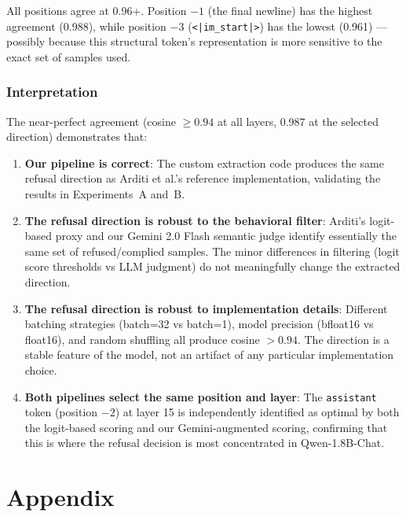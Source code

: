 \documentclass[11pt,a4paper]{article}
\begin{document}
All positions agree at 0.96+. Position $-1$ (the final newline) has the highest agreement (0.988), while position $-3$ (\texttt{<|im\_start|>}) has the lowest (0.961) --- possibly because this structural token's representation is more sensitive to the exact set of samples used.

\section{Interpretation}

The near-perfect agreement (cosine $\geq 0.94$ at all layers, 0.987 at the selected direction) demonstrates that:

\begin{enumerate}[nosep]
\item \textbf{Our pipeline is correct}: The custom extraction code produces the same refusal direction as Arditi et al.'s reference implementation, validating the results in Experiments~A and~B.

\item \textbf{The refusal direction is robust to the behavioral filter}: Arditi's logit-based proxy and our Gemini 2.0 Flash semantic judge identify essentially the same set of refused/complied samples. The minor differences in filtering (logit score thresholds vs LLM judgment) do not meaningfully change the extracted direction.

\item \textbf{The refusal direction is robust to implementation details}: Different batching strategies (batch=32 vs batch=1), model precision (bfloat16 vs float16), and random shuffling all produce cosine $>0.94$. The direction is a stable feature of the model, not an artifact of any particular implementation choice.

\item \textbf{Both pipelines select the same position and layer}: The \texttt{assistant} token (position $-2$) at layer 15 is independently identified as optimal by both the logit-based scoring and our Gemini-augmented scoring, confirming that this is where the refusal decision is most concentrated in Qwen-1.8B-Chat.
\end{enumerate}

\appendix
\part*{Appendix}
\end{document}

